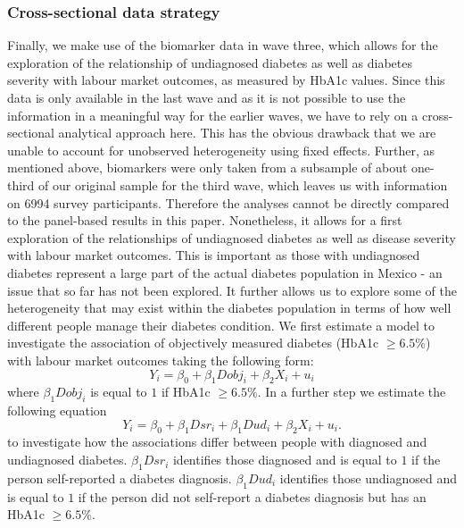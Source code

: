 \subsubsection{Cross-sectional data strategy}

Finally, we make use of the biomarker data in wave three, which allows
for the exploration of the relationship of undiagnosed diabetes as
well as diabetes severity with labour market outcomes, as measured
by \ac{HbA1c} values. Since this data is only available in the
last wave and as it is not possible to use the information in a meaningful
way for the earlier waves, we have to rely on a cross-sectional analytical
approach here. This has the obvious drawback that we are unable to
account for unobserved heterogeneity using fixed effects. Further,
as mentioned above, biomarkers were only taken from a subsample of
about one-third of our original sample for the third wave, which leaves
us with information on 6994 survey participants. Therefore the analyses
cannot be directly compared to the panel-based results in this paper.
Nonetheless, it allows for a first exploration of the relationships
of undiagnosed diabetes as well as disease severity with labour market
outcomes. This is important as those with undiagnosed diabetes represent
a large part of the actual diabetes population in Mexico - an issue
that so far has not been explored. It further allows us to explore
some of the heterogeneity that may exist within the diabetes population
in terms of how well different people manage their diabetes condition.
We first estimate a model to investigate the association of objectively
measured diabetes (HbA1c $\geq6.5\%$) with labour market outcomes
taking the following form: 
\begin{equation}
Y_{i}=\beta_{0}+\beta_{1}Dobj_{i}+\beta_{2}X_{i}+u_{i}\label{eq:diab_objective}
\end{equation}
where $\beta_{1}Dobj_{i}$ is equal to $1$ if HbA1c $\geq6.5\%$.
In a further step we estimate the following equation 
\begin{equation}
Y_{i}=\beta_{0}+\beta_{1}Dsr_{i}+\beta_{1}Dud_{i}+\beta_{2}X_{i}+u_{i}.\label{eq:diab_sr_ud}
\end{equation}
to investigate how the associations differ between people with diagnosed
and undiagnosed diabetes. $\beta_{1}Dsr_{i}$ identifies those diagnosed
and is equal to $1$ if the person self-reported a diabetes diagnosis.
$\beta_{1}Dud_{i}$ identifies those undiagnosed and is equal to $1$
if the person did not self-report a diabetes diagnosis but has an
HbA1c $\geq6.5\%$.

